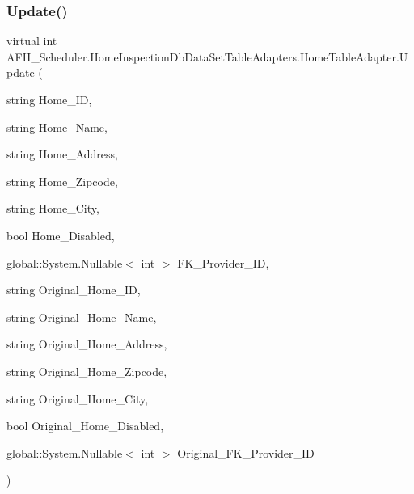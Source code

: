 \subsubsection{Update()\hspace{0.1cm}{\footnotesize\ttfamily [5/6]}}
{\footnotesize\ttfamily virtual int A\+F\+H\+\_\+\+Scheduler.\+Home\+Inspection\+Db\+Data\+Set\+Table\+Adapters.\+Home\+Table\+Adapter.\+Update (\begin{DoxyParamCaption}\item[{string}]{Home\+\_\+\+ID,  }\item[{string}]{Home\+\_\+\+Name,  }\item[{string}]{Home\+\_\+\+Address,  }\item[{string}]{Home\+\_\+\+Zipcode,  }\item[{string}]{Home\+\_\+\+City,  }\item[{bool}]{Home\+\_\+\+Disabled,  }\item[{global\+::\+System.\+Nullable$<$ int $>$}]{F\+K\+\_\+\+Provider\+\_\+\+ID,  }\item[{string}]{Original\+\_\+\+Home\+\_\+\+ID,  }\item[{string}]{Original\+\_\+\+Home\+\_\+\+Name,  }\item[{string}]{Original\+\_\+\+Home\+\_\+\+Address,  }\item[{string}]{Original\+\_\+\+Home\+\_\+\+Zipcode,  }\item[{string}]{Original\+\_\+\+Home\+\_\+\+City,  }\item[{bool}]{Original\+\_\+\+Home\+\_\+\+Disabled,  }\item[{global\+::\+System.\+Nullable$<$ int $>$}]{Original\+\_\+\+F\+K\+\_\+\+Provider\+\_\+\+ID }\end{DoxyParamCaption})\hspace{0.3cm}{\ttfamily [virtual]}}

\mbox{\label{class_a_f_h___scheduler_1_1_home_inspection_db_data_set_table_adapters_1_1_home_table_adapter_a151f1bf6de8df30e5621c06abeb02752}} 
